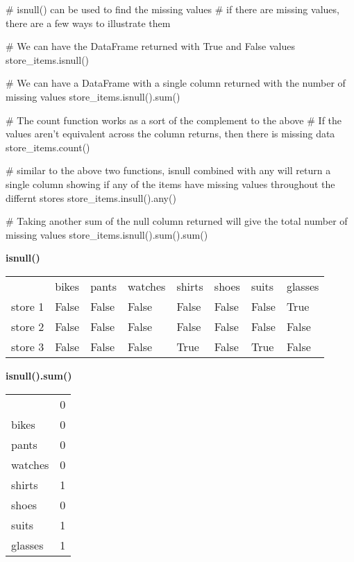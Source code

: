 \documentclass{article}
\begin{document}
\begin{python}
	# isnull() can be used to find the missing values
	# if there are missing values, there are a few ways to illustrate them
	
	# We can have the DataFrame returned with True and False values
	store_items.isnull()
	
	# We can have a DataFrame with a single column returned with the number of missing values
	store_items.isnull().sum()
	
	# The count function works as a sort of the complement to the above
	# If the values aren't equivalent across the column returns, then there is missing data
	store_items.count()
	
	# similar to the above two functions, isnull combined with any will return a single column showing if any of the items have missing values throughout the differnt stores
	store_items.insull().any()
	
	# Taking another sum of the null column returned will give the total number of missing values
	store_items.isnull().sum().sum()
\end{python}

\textbf{isnull()}
\begin{center}
	\begin{tabular}{llllllll}
		{} &  bikes &  pants &  watches &  shirts &  shoes &  suits &  glasses \\
		store 1 &  False &  False &    False &   False &  False &  False &     True \\
		store 2 &  False &  False &    False &   False &  False &  False &    False \\
		store 3 &  False &  False &    False &    True &  False &   True &    False \\
	\end{tabular}
\end{center}

\textbf{isnull().sum()}
\begin{center}
	\begin{tabular}{lr}
		{} &  0 \\
		bikes   &  0 \\
		pants   &  0 \\
		watches &  0 \\
		shirts  &  1 \\
		shoes   &  0 \\
		suits   &  1 \\
		glasses &  1 \\
	\end{tabular}
\end{center}
\end{document}
